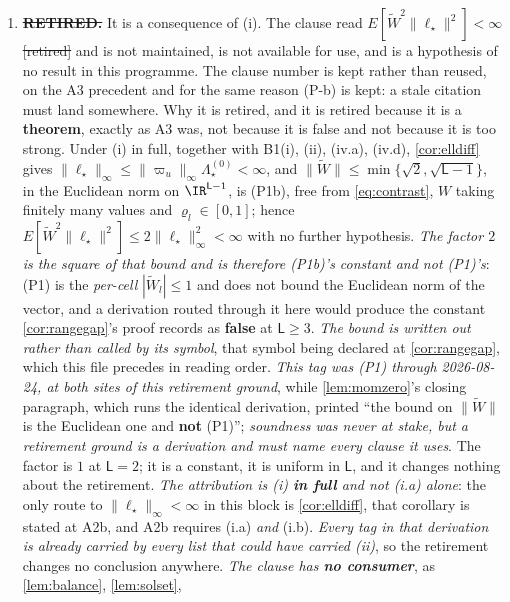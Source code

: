 \begin{enumerate}
\item[(ii)] \textbf{\sout{RETIRED.}} It is a consequence of \textup{(i)}.
The clause read
$E[\widetilde W^{2}\|\ell_\star\|^{2}]<\infty$ \sout{[retired]} and is not maintained, is not
available for use, and is a hypothesis of no result in this programme. The clause number is kept
rather than reused, on the A3 precedent and for the same reason \textup{(P-b)} is kept: a stale
citation must land somewhere.
Why it is retired, and it is retired because it is a \textbf{theorem}, exactly as A3 was, not
because it is false and not because it is too strong. Under (i) in full, together with B1(i), (ii),
(iv.a), (iv.d), \cref{cor:elldiff} gives $\|\ell_\star\|_\infty\le\|\varpi_u\|_\infty\Lambda^{(0)}_\star<\infty$,
and $\|\widetilde W\|\le\min\{\sqrt2,\sqrt{\mathsf L-1}\}$, in the Euclidean norm on
$\IR^{\mathsf L-1}$, is \textup{(P1b)}, free from \eqref{eq:contrast}, $W$ taking finitely many values and
$\varrho_l\in[0,1]$; hence
$E[\widetilde W^{2}\|\ell_\star\|^{2}]\le2\|\ell_\star\|_\infty^{2}<\infty$ with no further hypothesis.
\emph{The factor $2$ is the square of that bound and is therefore \textup{(P1b)}'s constant and not
\textup{(P1)}'s}: \textup{(P1)} is the
\emph{per-cell} $|\widetilde W_l|\le1$ and does not bound the Euclidean norm of the vector, and a
derivation routed through it here would produce the constant \cref{cor:rangegap}'s proof records as
\textbf{false} at $\mathsf L\ge3$. \emph{The bound is written out rather than called by its symbol},
that symbol being declared at \cref{cor:rangegap}, which this file precedes in reading order.
\emph{This tag was \textup{(P1)} through 2026-08-24, at both sites of
this retirement ground}, while \cref{lem:momzero}'s closing paragraph, which runs the identical
derivation, printed ``the bound on $\|\widetilde W\|$ is the Euclidean one and \textbf{not}
\textup{(P1)}''; \emph{soundness was never at stake, but a retirement ground is a derivation and must
name every clause it uses}. The factor is $1$ at
$\mathsf L=2$; it is a constant, it is uniform in $\mathsf L$, and it changes nothing about the
retirement.
\emph{The attribution is (i) \textbf{in full} and not (i.a) alone}: the only route to
$\|\ell_\star\|_\infty<\infty$ in this block is \cref{cor:elldiff}, that corollary is stated at A2b, and
A2b requires (i.a) \emph{and} (i.b). \emph{Every tag in that derivation is already carried by every list
that could have carried (ii)}, so the retirement changes no conclusion anywhere.
\emph{The clause has \textbf{no consumer}}, as \cref{lem:balance}, \cref{lem:solset},

\end{enumerate}
